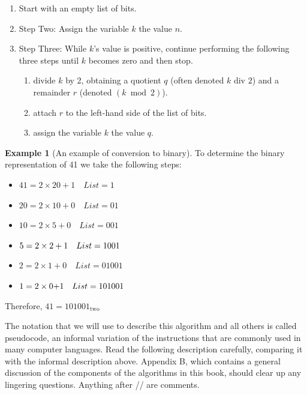 \documentclass[10pt,]{book}
\theoremstyle{plain}
\theoremstyle{definition}
\newtheorem{example}[theorem]{Example}
\begin{document}
\par
\leavevmode%
\begin{enumerate}
\item\hypertarget{li-130}{} Start with an empty list of bits. \item\hypertarget{li-131}{} Step Two: Assign the variable \(k\) the value \(n\). \item\hypertarget{li-132}{} Step Three: While \(k\)'s value is positive, continue performing the following three steps until \(k\) becomes zero and then stop. 
	\begin{enumerate}
\item\hypertarget{li-133}{}divide \(k\) by 2, obtaining a quotient \(q\) (often denoted \(k \textrm{ div } 2\)) and a remainder \(r\) (denoted \((k \bmod 2)\)). \item\hypertarget{li-134}{}attach \(r\) to the left-hand side of the list of bits. \item\hypertarget{li-135}{} assign the variable \(k\) the value \(q\).\end{enumerate}
\end{enumerate}
%
\begin{example}[An example of conversion to binary]\label{An_example_of_conversion_to_binary}
 To determine the binary representation of 41 we take the following steps:
\leavevmode%
\begin{itemize}[label=\textbullet]
\item{}\(41 = 2 \times  20+ 1 \quad List = 1 \) \item{}\(20 = 2 \times  10+0 \quad List = 01 \)\item{} \(10 = 2\times 5 + 0 \quad List = 001 \)\item{}\(5 =\text2\times  2+ 1 \quad List =1001\) \item{}\(2 =2\times  1+ 0 \quad List = 01001 \)\item{}\(1 =\text2 \times 0\text+1  \quad List = 101001\) \end{itemize}
   
Therefore, \(41=101001_{\textrm{two}}\)%
\end{example}
\par
The notation that we will use to describe this algorithm and all others is called pseudocode, an informal variation of the instructions that are commonly used in many computer languages. Read the following description carefully, comparing it with the informal description above. Appendix B, which contains a general discussion of the components of the algorithms in this book, should clear up any lingering questions. Anything after // are comments.%
\end{document}
